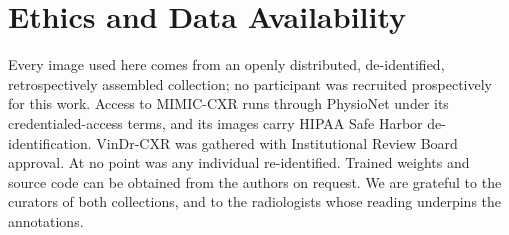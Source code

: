 \documentclass[conference]{IEEEtran}
\begin{document}
\section*{Ethics and Data Availability}

Every image used here comes from an openly distributed, de-identified,
retrospectively assembled collection; no participant was recruited
prospectively for this work. Access to MIMIC-CXR \cite{johnson2019mimic} runs
through PhysioNet under its credentialed-access terms, and its images carry
HIPAA Safe Harbor de-identification. VinDr-CXR \cite{nguyen2022} was gathered
with Institutional Review Board approval. At no point was any individual
re-identified. Trained weights and source code can be obtained from the authors
on request. We are grateful to the curators of both collections, and to the
radiologists whose reading underpins the annotations.
\end{document}
